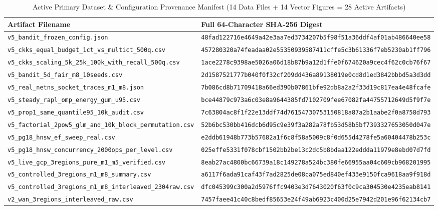 \documentclass[10pt,journal,compsoc]{IEEEtran}
\begin{document}
\begin{table}[!t]
\centering
\caption{Active Primary Dataset \& Configuration Provenance Manifest (14 Data Files + 14 Vector Figures = 28 Active Artifacts)}
\label{tab:s_manifest}
\scriptsize
\begin{adjustbox}{max width=\textwidth}
\begin{tabular}{ll}
\toprule
\textbf{Artifact Filename} & \textbf{Full 64-Character SHA-256 Digest} \\
\midrule
\nolinkurl{v5_bandit_frozen_config.json} & \texttt{48fad122716e4649a42e3aa7ed3734207b5f98f51a36ddf4af01ab486640ee58} \\
\nolinkurl{v5_ckks_equal_budget_1ct_vs_multict_500q.csv} & \texttt{457280320a74feadaa02e55350939587411cffe5c3b61336f7eb5230ab1ff796} \\
\nolinkurl{v5_ckks_scaling_5k_25k_100k_with_recall_500q.csv} & \texttt{1ace2278c9398ae5026a06d18b87b9a12d1ffe0f674620a9cec4f62c0cb76f67} \\
\nolinkurl{v5_bandit_5d_fair_m8_10seeds.csv} & \texttt{2d1587521777b040f0f32cf209dd436a89138019e0cd8d1ed3842bbbd5a3d3dd} \\
\nolinkurl{v5_real_netns_socket_traces_m1_m8.json} & \texttt{7b086cd8b71709418a66ed390b07861bfe92db8a2a2f33d19c817ea4e48fcafe} \\
\nolinkurl{v5_steady_rapl_omp_energy_gum_u95.csv} & \texttt{bce44879c973a6c03e8a9644385fd7102709fee67082fa44755712649d5f9f7e} \\
\nolinkurl{v5_prop1_same_quantile95_10k_audit.csv} & \texttt{7c63804ac8f1f22e13ddf74d76154730753150818a87a2b1aabe2f0a8758d793} \\
\nolinkurl{v5_factorial_2pow5_glm_and_10k_block_permutation.csv} & \texttt{52b6bc530bb416dcb6d95c9e39f3a282a78fb53d58b5bf7393327653050d047e} \\
\nolinkurl{v5_pg18_hnsw_ef_sweep_real.csv} & \texttt{e2ddb61948b773b57682a1f6c8f58a5009c8f0d655d4278fe5a60404478b253c} \\
\nolinkurl{v5_pg18_hnsw_concurrency_2000ops_per_level.csv} & \texttt{025effe5331f078cbf1502bb2be13c2dc5b8bdaa122eddda11979e8ebd07d7fd} \\
\nolinkurl{v5_live_gcp_3regions_pure_m1_m5_verified.csv} & \texttt{8eab27ac4800bc66739a18c149278a524bc380fe66955aa04c609cb968201995} \\
\nolinkurl{v5_controlled_3regions_m1_m8_summary.csv} & \texttt{a6117f6ada91caf43f7ad2825de08ca075ed840ef433e9150fca9618aa9f918d} \\
\nolinkurl{v5_controlled_3regions_m1_m8_interleaved_2304raw.csv} & \texttt{dfc045399c300a2d5976ffc9403e3d7643020f63f0c9ca304530e4235eab8141} \\
\nolinkurl{v2_wan_3regions_interleaved_raw.csv} & \texttt{7457faee41c40c8bedf85653e24f49ab6923c400d25e7942d201e96f62134cb7} \\
\bottomrule
\end{tabular}
\end{adjustbox}
\end{table}
\end{document}
